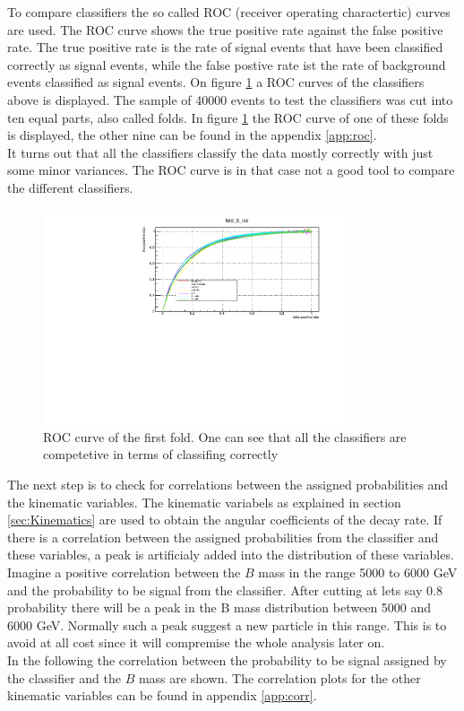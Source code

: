 \documentclass[english]{uzhpub}
\begin{document}
To compare classifiers the so called ROC (receiver operating charactertic) curves are used. The ROC curve shows the true positive rate against the false positive rate. The true positive rate is the rate of signal events that have been classified correctly as signal events, while the false postive rate ist the rate of background events classified as signal events. On figure \ref{fig:roc} a ROC curves of the classifiers above is displayed.
The sample of 40000 events to test the classifiers was cut into ten equal parts, also called folds. In figure \ref{fig:roc} the ROC curve of one of these folds is displayed, the other nine can be found in the appendix \ref{app:roc}. \\
 It turns out that all the classifiers classify the data mostly correctly with just some minor variances. The ROC curve is in that case not a good tool to compare the different classifiers.
 \begin{figure}[H]
  \centering
  \includegraphics[width=0.8\textwidth]{roc/fold_0_roc.pdf}
  \caption{ROC curve of the first fold. One can see that all the classifiers are competetive in terms of classifing correctly}
  \label{fig:roc}
 \end{figure}
 The next step is to check for correlations between the assigned probabilities and the kinematic variables. The kinematic variabels as explained in section \ref{sec:Kinematics} are used to obtain the angular coefficients of the decay rate. If there is a correlation between the assigned probabilities from the classifier and these variables, a peak is artificialy added into the distribution of these variables. Imagine a positive correlation between the $B$ mass in the range 5000 to 6000 GeV and the probability to be signal from the classifier. After cutting at lets say 0.8 probability there will be a peak in the B mass distribution between 5000 and 6000 GeV. Normally such a peak suggest a new particle in this range. This is to avoid at all cost since it will compremise the whole analysis later on. \\
In the following the correlation between the probability to be signal assigned by the classifier and the $B$ mass are shown. The correlation plots for the other kinematic variables can be found in appendix \ref{app:corr}.
\end{document}
